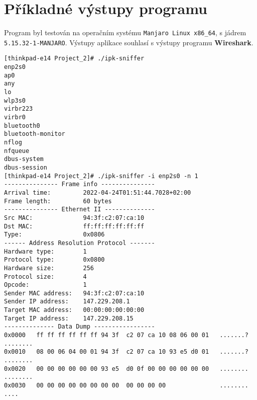 \documentclass[a4paper,11pt]{article}
\begin{document}
    \newpage
    \section{Příkladné výstupy programu}
    Program byl testován na operačním systému \verb|Manjaro Linux x86_64|, s jádrem \verb|5.15.32-1-MANJARO|.
    Výstupy aplikace souhlasí s výstupy programu \textbf{Wireshark}.
    
\begin{verbatim}
[thinkpad-e14 Project_2]# ./ipk-sniffer 
enp2s0
ap0
any
lo
wlp3s0
virbr223
virbr0
bluetooth0
bluetooth-monitor
nflog
nfqueue
dbus-system
dbus-session
[thinkpad-e14 Project_2]# ./ipk-sniffer -i enp2s0 -n 1
--------------- Frame info ---------------
Arrival time:         2022-04-24T01:51:44.7028+02:00
Frame length:         60 bytes
--------------- Ethernet II --------------
Src MAC:              94:3f:c2:07:ca:10
Dst MAC:              ff:ff:ff:ff:ff:ff
Type:                 0x0806
------ Address Resolution Protocol -------
Hardware type:        1
Protocol type:        0x0800
Hardware size:        256
Protocol size:        4
Opcode:               1
Sender MAC address:   94:3f:c2:07:ca:10
Sender IP address:    147.229.208.1
Target MAC address:   00:00:00:00:00:00
Target IP address:    147.229.208.15
-------------- Data Dump -----------------
0x0000   ff ff ff ff ff ff 94 3f  c2 07 ca 10 08 06 00 01   .......? ........
0x0010   08 00 06 04 00 01 94 3f  c2 07 ca 10 93 e5 d0 01   .......? ........
0x0020   00 00 00 00 00 00 93 e5  d0 0f 00 00 00 00 00 00   ........ ........
0x0030   00 00 00 00 00 00 00 00  00 00 00 00               ........ ....
\end{verbatim}

    \newpage
    
    \renewcommand{\refname}{Literatura}
    
\end{document}
